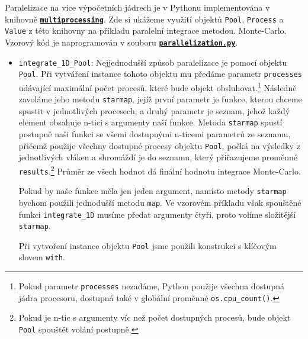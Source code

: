 \documentclass[a4paper,11pt,twoside]{article}
\def\code#1{\textnormal{\texttt{#1}}}
\def\file#1{\textnormal{\textbf{\texttt{#1}}}}
\def\ghfile#1#2{\textnormal{\textbf{\texttt{\href{https://github.com/PavelStransky/PCInPhysics/blob/main/#1#2}{#2}}}}}
\theoremstyle{red}
\theoremstyle{green}
\begin{document}
    Paralelizace na více výpočetních jádrech je v Pythonu implementována v knihovně \file{\href{https://docs.python.org/3/library/multiprocessing.html}{mul\-ti\-pro\-ces\-sing}}.
    Zde si ukážeme využití objektů \code{Pool}, \code{Process} a \code{Value} z této knihovny na příkladu paralelní integrace metodou. Monte-Carlo.
    Vzorový kód je naprogramován v souboru \ghfile{python/montecarlo/}{parallelization.py}.
    \begin{itemize}
        \item \code{integrate_1D_Pool}:
            Nejjednodušší způsob paralelizace je pomocí objektu \code{Pool}. 
            Při vytváření instance tohoto objektu mu předáme parametr \code{processes} udávající maximální počet procesů, které bude objekt obsluhovat.\footnote{
                Pokud parametr \code{processes} nezadáme, Python použije všechna dostupná jádra procesoru, dostupná také v globální proměnné \code{os.cpu\_count()}.
            }
            Následně zavoláme jeho metodu \code{starmap}, jejíž první parametr je funkce, kterou chceme spustit v jednotlivých procesech, a druhý parametr je seznam, jehož každý element obsahuje n-tici s argumenty naší funkce.
            Metoda \code{starmap} spustí postupně naši funkci se všemi dostupnými n-ticemi parametrů ze seznamu, přičemž použije všechny dostupné procesy objektu \code{Pool},
            počká na výsledky z jednotlivých vláken a shromáždí je do seznamu, který přiřazujeme proměnné \code{results}.\footnote{
                Pokud je n-tic s argumenty víc než počet dostupných procesů, bude objekt \code{Pool} spouštět volání postupně.
            }
            Průměr ze všech hodnot dá finální hodnotu integrace Monte-Carlo.

            Pokud by naše funkce měla jen jeden argument, namísto metody \code{starmap} bychom použili jednodušší metodu \code{map}.
            Ve vzorovém příkladu však spouštěné funkci \code{integrate_1D} musíme předat argumenty čtyři, proto volíme složitější \code{starmap}.

            Při vytvoření instance objektu \code{Pool} jsme použili konstrukci s klíčovým slovem \code{with}.


\end{itemize}
\end{document}
